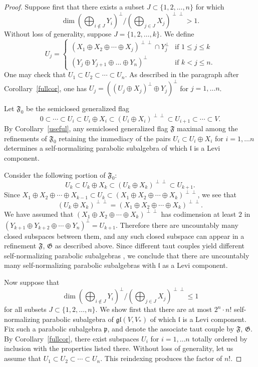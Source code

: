 \documentclass{amsart}
\theoremstyle{definition}
\theoremstyle{remark}
\numberwithin{equation}{section}
\def\gl{\mathfrak {gl}}
\def\l{\mathfrak {l}}
\def\p{\mathfrak {p}}
\def\F{\mathfrak{F}}
\def\G{\mathfrak{G}}
\begin{document}
\begin{proof}
Suppose first that there exists a subset $J \subset \{ 1, 2, \ldots, n \}$ for which
$$\dim (\bigoplus_{i \notin J} Y_i)^\perp / (\bigoplus_{j \in J} X_j)^{\perp \perp} > 1.$$
Without loss of generality, suppose $J = \{ 1, 2, \ldots, k \}$.  We define
$$U_j =
\begin{cases}
(X_1 \oplus X_2 \oplus \cdots \oplus X_j)^{\perp \perp} \cap Y_j^\perp & \textrm{if } 1 \leq j \leq k \\
(Y_j \oplus Y_{j+1} \oplus \ldots \oplus Y_n)^\perp & \textrm{if } k < j \leq n.
\end{cases}
$$
One may check that $U_1 \subset U_2 \subset \cdots \subset U_n$.  
As described in the paragraph after Corollary~\ref{fullcor}, one has $U_j = ((U_j \oplus X_j)^\perp \oplus Y_j)^\perp$ for $j = 1, \ldots n$.  

Let $\F_0$ be the semiclosed generalized flag
$$0 \subset \cdots \subset U_i \subset U_i \oplus X_i \subset (U_i \oplus X_i)^{\perp \perp} \subset U_{i+1} \subset \cdots \subset V.$$
By Corollary~\ref{useful}, any semiclosed generalized flag $\F$ maximal among the refinements of $\F_0$ retaining the immediacy of the pairs $U_i \subset U_i \oplus X_i$ for $i = 1, \ldots n$ determines a self-normalizing parabolic subalgebra of which $\l$ is a Levi component.

Consider the following portion of $\F_0$:
$$U_k \subset U_k \oplus X_k \subset (U_k \oplus X_k)^{\perp \perp} \subset U_{k+1}.$$
Since $X_1 \oplus X_2 \oplus \cdots \oplus X_{k-1} \subset U_k \subset (X_1 \oplus X_2 \oplus \cdots \oplus X_k)^{\perp \perp}$, we see that $$(U_k \oplus X_k)^{\perp \perp} = (X_1 \oplus X_2 \oplus \cdots \oplus X_k)^{\perp \perp}.$$  We have assumed that $(X_1 \oplus X_2 \oplus \cdots \oplus X_k)^{\perp \perp}$ has codimension at least $2$ in $(Y_{k+1} \oplus Y_{k+2} \oplus \cdots \oplus Y_n)^\perp = U_{k+1}$.  Therefore there are uncountably many closed subspaces between them, and any such closed subspace can appear in a refinement $\F$, $\G$ as described above.  Since different taut couples yield different self-normalizing parabolic subalgebras \cite[Proposition 3.8]{DP}, we conclude that there are uncountably many self-normalizing parabolic subalgebras with $\l$ as a Levi component.

Now suppose that $$\dim (\bigoplus_{i \notin J} Y_i)^\perp / (\bigoplus_{j \in J} X_j)^{\perp \perp} \leq 1$$
for all subsets $J \subset \{ 1, 2, \ldots, n \}$.  We show first that there are at most $2^n \cdot n!$ self-normalizing parabolic subalgebra of $\gl(V,V_*)$ of which $\l$ is a Levi component.  Fix such a parabolic subalgebra $\p$, and denote the associate taut couple by $\F$, $\G$.  By Corollary~\ref{fullcor}, there exist subspaces $U_i$ for $i = 1, \ldots n$ totally ordered by inclusion with the properties listed there.  Without loss of generality, let us assume that $U_1 \subset U_2 \subset \cdots \subset U_n$.  This reindexing produces the factor of $n!$.


\end{proof}
\end{document}
